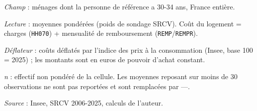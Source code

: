 \documentclass[12pt,a4paper]{article}
\begin{document}
\begin{table}[htbp]
\begin{threeparttable}
\begin{tablenotes}[flushleft]
				\item \textit{Champ} : ménages dont la personne de référence a 30-34 ans, France entière.
				\item \textit{Lecture} : moyennes pondérées (poids de sondage SRCV). Coût du logement =
				charges (\texttt{HH070}) + mensualité de remboursement (\texttt{REMP}/\texttt{REMPR}).
				\item \textit{Déflateur} : coûts déflatés par l'indice des prix à la consommation (Insee, base 100 = 2025) ; les montants sont en euros de pouvoir d'achat constant.
				\item \textit{n} : effectif non pondéré de la cellule. Les moyennes reposant sur
				moins de 30 observations ne sont pas reportées et sont remplacées par ---.
				\item \textit{Source} : Insee, SRCV 2006-2025, calculs de l'auteur.
			\end{tablenotes}
		\end{threeparttable}
	\end{table}
	
\end{document}
